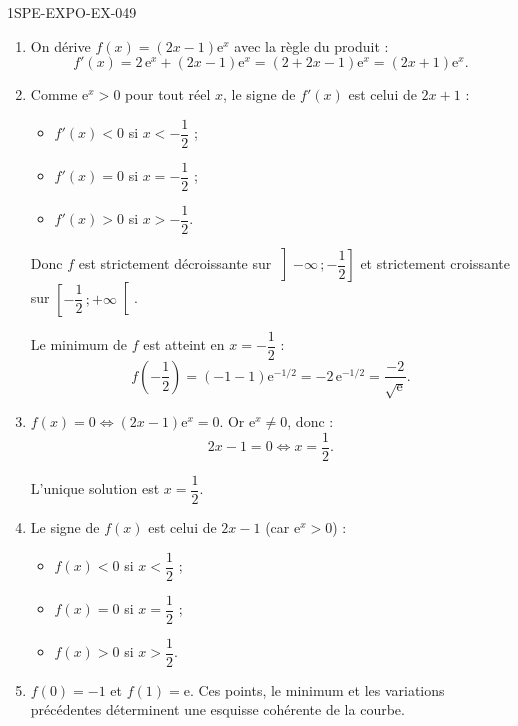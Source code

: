 \begin{corrige}{1SPE-EXPO-EX-049}
\begin{enumerate}
\item On dérive $f(x) = (2x - 1)\mathrm{e}^x$ avec la règle du produit :
\[f'(x) = 2\,\mathrm{e}^x + (2x - 1)\mathrm{e}^x = (2 + 2x - 1)\mathrm{e}^x = (2x + 1)\mathrm{e}^x.\]

\item Comme $\mathrm{e}^x > 0$ pour tout réel $x$, le signe de $f'(x)$ est celui de $2x + 1$ :
\begin{itemize}
\item $f'(x) < 0$ si $x < -\dfrac{1}{2}$ ;
\item $f'(x) = 0$ si $x = -\dfrac{1}{2}$ ;
\item $f'(x) > 0$ si $x > -\dfrac{1}{2}$.
\end{itemize}

Donc $f$ est strictement décroissante sur $\left]-\infty\,;-\dfrac{1}{2}\right]$ et strictement croissante sur $\left[-\dfrac{1}{2}\,;+\infty\right[$.

Le minimum de $f$ est atteint en $x = -\dfrac{1}{2}$ :
\[f\!\left(-\dfrac{1}{2}\right) = \left(-1 - 1\right)\mathrm{e}^{-1/2} = -2\,\mathrm{e}^{-1/2} = \dfrac{-2}{\sqrt{\mathrm{e}}}.\]

\item $f(x) = 0 \iff (2x - 1)\mathrm{e}^x = 0$. Or $\mathrm{e}^x
\neq 0$, donc :
\[2x - 1 = 0 \iff x = \dfrac{1}{2}.\]

L'unique solution est $\boxed{x = \dfrac{1}{2}}$.

\item Le signe de $f(x)$ est celui de $2x - 1$ (car $\mathrm{e}^x > 0$) :
\begin{itemize}
\item $f(x) < 0$ si $x < \dfrac{1}{2}$ ;
\item $f(x) = 0$ si $x = \dfrac{1}{2}$ ;
\item $f(x) > 0$ si $x > \dfrac{1}{2}$.
\end{itemize}

\item $f(0)=-1$ et $f(1)=\mathrm{e}$. Ces points, le minimum et les variations précédentes déterminent une esquisse cohérente de la courbe.
\end{enumerate}
\end{corrige}
